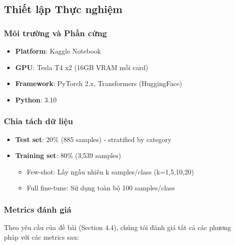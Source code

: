 \subsection{Thiết lập Thực nghiệm}\label{subsec:experiment-setup}

\subsubsection{Môi trường và Phần cứng}
\begin{itemize}
    \item \textbf{Platform}: Kaggle Notebook
    \item \textbf{GPU}: Tesla T4 x2 (16GB VRAM mỗi card)
    \item \textbf{Framework}: PyTorch 2.x, Transformers (HuggingFace)
    \item \textbf{Python}: 3.10
\end{itemize}

\subsubsection{Chia tách dữ liệu}
\begin{itemize}
    \item \textbf{Test set}: 20\% (885 samples) - stratified by category
    \item \textbf{Training set}: 80\% (3,539 samples)
    \begin{itemize}
        \item Few-shot: Lấy ngẫu nhiên k samples/class (k=1,5,10,20)
        \item Full fine-tune: Sử dụng toàn bộ 100 samples/class
    \end{itemize}
\end{itemize}

\subsubsection{Metrics đánh giá}
Theo yêu cầu của đề bài (Section 4.4), chúng tôi đánh giá tất cả các phương pháp với các metrics sau:

